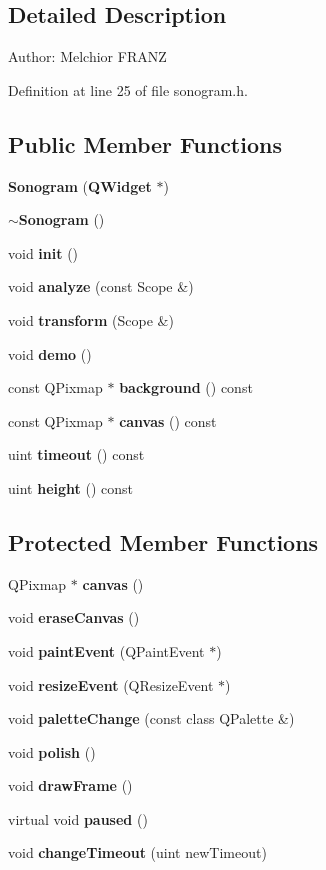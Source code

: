 \subsection{Detailed Description}
\begin{Desc}
\item[Author:]Melchior FRANZ \end{Desc}




Definition at line 25 of file sonogram.h.\subsection*{Public Member Functions}
\begin{CompactItemize}
\item 
{\bf Sonogram} ({\bf QWidget} $\ast$)
\item 
{\bf $\sim$Sonogram} ()
\item 
void {\bf init} ()
\item 
void {\bf analyze} (const Scope \&)
\item 
void {\bf transform} (Scope \&)
\item 
void {\bf demo} ()
\item 
const QPixmap $\ast$ {\bf background} () const 
\item 
const QPixmap $\ast$ {\bf canvas} () const 
\item 
uint {\bf timeout} () const
\item 
uint {\bf height} () const
\end{CompactItemize}
\subsection*{Protected Member Functions}
\begin{CompactItemize}
\item 
QPixmap $\ast$ {\bf canvas} ()
\item 
void {\bf erase\-Canvas} ()
\item 
void {\bf paint\-Event} (QPaint\-Event $\ast$)
\item 
void {\bf resize\-Event} (QResize\-Event $\ast$)
\item 
void {\bf palette\-Change} (const class QPalette \&)
\item 
void {\bf polish} ()
\item 
void {\bf draw\-Frame} ()
\item 
virtual void {\bf paused} ()
\item 
void {\bf change\-Timeout} (uint new\-Timeout)
\end{CompactItemize}
